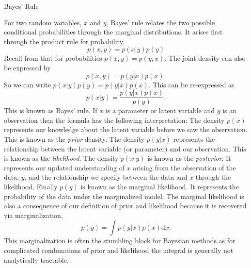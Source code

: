 \begin{boxfloat}
  \caption{Bayes' Rule}\label{box:bayes}
  \boxfontsize

  For two random variables, $x$ and $y$, Bayes'
  rule relates the two possible conditional probabilities through the
  marginal distributions. It arises first through the product rule for
  probability,
  \[
  p(x, y) = p(x|y)p(y)
  \]
  Recall from  that for probabilities $p(x, y) = p(y, x)$. The joint density can also be expressed by  
  \[
  p(x, y) = p(y|x)p(x).
  \]
  So we can write $p(x|y)p(y)=p(y|x)p(x)$. This can be re-expressed as
  \[
  p(x|y) = \frac{p(y|x)p(x)}{p(y)}.
  \]
  This is known as Bayes' rule. If $x$ is a
  parameter or latent variable and $y$ is an observation then the
  formula has the following interpretation: The density $p(x)$
  represents our knowledge about the latent variable before we saw the
  observation. This is known as the
  \emph{\gls{prior}} density. The density $p(y|x)$ represents the
  relationship between the latent variable (or parameter) and our
  observation. This is known as the
  \emph{\gls{likelihood}}. The density $p(x|y)$ is
  known as the \emph{\gls{posterior}}. It represents our updated
  understanding of $x$ arising from the observation of the data, $y$,
  and the relationship we specify between the data and $x$ through the
  likelihood. Finally $p(y)$ is known as the marginal likelihood. It
  represents the probability of the data under the marginalized
  model. The marginal likelihood is also a consequence of our
  definition of prior and likelihood because it is recovered via
  marginalization,
  \[
  p(y) = \int p(y|x)p(x) \text{d}x.
  \]
  This marginalization is often the stumbling block for Bayesian
  methods as for complicated combinations of prior and likelihood the
  integral is generally not analytically tractable.
\end{boxfloat}


